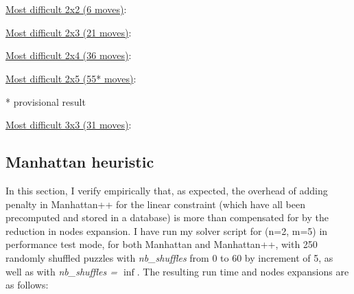 \\
\\
\underline{Most difficult 2x2 (6 moves)}:
\begin{center}
\begin{three}
\end{three}
\end{center}
\underline{Most difficult 2x3 (21 moves)}:
\begin{center}
\begin{five}
\end{five}
\end{center}
\underline{Most difficult 2x4 (36 moves)}:
\begin{center}
\begin{seven}
\end{seven}
\end{center}
\underline{Most difficult 2x5 (55* moves)}:
\begin{center}
\begin{nine}
\tiny{* provisional result}
\end{nine}
\end{center}
\underline{Most difficult 3x3 (31 moves)}:
\begin{center}
\begin{eight}
\end{eight}
\end{center}




\subsection{Manhattan heuristic}
\label{MHComp}
In this section, I verify empirically that, as expected, the overhead of adding penalty in Manhattan++ for the linear constraint (which have all been precomputed and stored in a database) is more than compensated for by the reduction in nodes expansion. I have run my solver script for (n=2, m=5) in performance test mode, for both Manhattan and Manhattan++, with 250 randomly shuffled puzzles with \textit{nb\_shuffles} from 0 to 60 by increment of 5, as well as with \textit{nb\_shuffles = $\inf$}. The resulting run time and nodes expansions are as follows:


